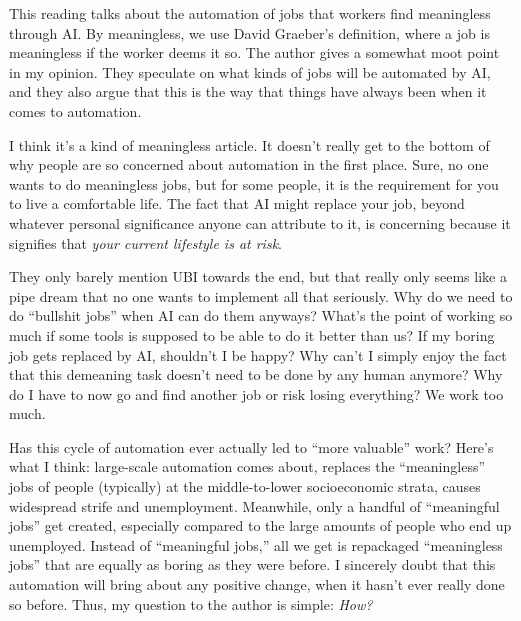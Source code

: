 This reading talks about the automation of jobs that workers find meaningless through AI.
By meaningless, we use David Graeber's definition, where a job is meaningless if the worker deems it so.
The author gives a somewhat moot point in my opinion.
They speculate on what kinds of jobs will be automated by AI, and they also argue that this is the way that things have always been when it comes to automation.

I think it's a kind of meaningless article.
It doesn't really get to the bottom of why people are so concerned about automation in the first place.
Sure, no one wants to do meaningless jobs, but for some people, it is the requirement for you to live a comfortable life.
The fact that AI might replace your job, beyond whatever personal significance anyone can attribute to it, is concerning because it signifies that \textit{your current lifestyle is at risk}.

They only barely mention UBI towards the end, but that really only seems like a pipe dream that no one wants to implement all that seriously.
Why do we need to do ``bullshit jobs'' when AI can do them anyways?
What's the point of working so much if some tools is supposed to be able to do it better than us?
If my boring job gets replaced by AI, shouldn't I be happy?
Why can't I simply enjoy the fact that this demeaning task doesn't need to be done by any human anymore?
Why do I have to now go and find another job or risk losing everything?
We work too much.

Has this cycle of automation ever actually led to ``more valuable'' work?
Here's what I think:
large-scale automation comes about, replaces the ``meaningless'' jobs of people (typically) at the middle-to-lower socioeconomic strata, causes widespread strife and unemployment.
Meanwhile, only a handful of ``meaningful jobs'' get created, especially compared to the large amounts of people who end up unemployed.
Instead of ``meaningful jobs,'' all we get is repackaged ``meaningless jobs'' that are equally as boring as they were before.
I sincerely doubt that this automation will bring about any positive change, when it hasn't ever really done so before.
Thus, my question to the author is simple:
\textit{How?}

